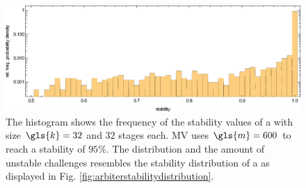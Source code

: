 \begin{figure}[ht]
\includegraphics[width=1.00\textwidth]{images/majority-xor-stability-distribution-simulation.eps}
\caption{The histogram shows the frequency of the stability values of a \mxpuf with size $\gls{k} = 32$ and $32$ stages each. \ac{MV} uses $\gls{m} = 600$ to reach a stability of $95 \%$. The distribution and the amount of unstable challenges resembles the stability distribution of a \apuf as displayed in Fig. \ref{fig:arbiterstabilitydistribution}.} 
\label{fig:stabilitydistributionmajorityvote}
\end{figure}












